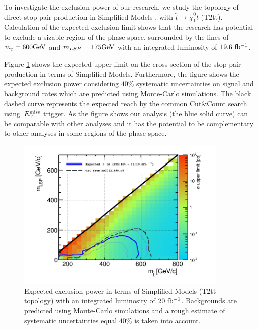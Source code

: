 To investigate the exclusion power of our research, we study the topology of direct stop pair production  in Simplified Models \cite{alves:sms}, with $\tilde{t}\to \tilde{\chi}^0_1 t$ (T2tt). 
Calculation of the expected exclusion limit shows that  
the research has potential to exclude 
a sizable region of the phase space, surrounded by the lines of $m_{\tilde{t}} = 600\rm{GeV}$ and $m_{LSP} = 175\rm{GeV}$ with an integrated luminosity of $19.6\,\,\rm{fb^{-1}}$.



Figure \ref{fig:limit_20inf} shows the expected upper limit on the cross section of the stop pair production in terms of Simplified Models. 
Furthermore, the figure shows the expected exclusion power considering 
$40\%$ systematic uncertainties on signal and background rates which are predicted using Monte-Carlo simulations. The black 
dashed curve represents the expected reach by the common Cut$\&$Count \cite{cutandcountAN} search using $\,{E_{\rm T}^{\rm miss}}$ trigger. 
As the figure shows our analysis (the blue solid curve) can be comparable with other analyses and   
it has the potential to be complementary to other analyses in some regions of the phase space.  



\begin{linenomath}
\begin{figure}[h]
\centering
\includegraphics[width=0.9\textwidth,keepaspectratio=true]{StatisticsFig/Exc_131030_196ifb.png}
\caption{Expected exclusion power in terms of Simplified Models (T2tt-topology) with an integrated luminosity of $20\,\,\rm{fb^{-1}}$. Backgrounds are predicted using Monte-Carlo simulations and a rough estimate of systematic uncertainties equal 
$40\%$ is taken into account.}
\label{fig:limit_20inf}
\end{figure}
\end{linenomath}


